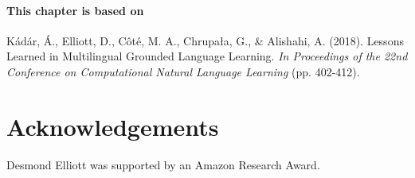 \newpage

\paragraph{This chapter is based on} Kádár, Á., Elliott, D., Côté, M. A., Chrupała, G., \& Alishahi, A. (2018).
Lessons Learned in Multilingual Grounded Language Learning. \textit{In Proceedings of the 22nd Conference on Computational Natural Language Learning}  (pp. 402-412).

\newpage










% 




\section*{Acknowledgements}
Desmond Elliott was supported by an Amazon Research Award.

%

%
%

%
%
